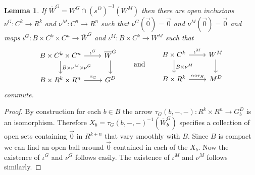 \documentclass[10pt,a4paper]{amsart}
\numberwithin{equation}{section}
\newtheorem{Lemma}[Theorem]{Lemma}
\begin{document}
\begin{Lemma}\label{open-inclusions}
If $\overline{W}^G=W^G \cap (s^D)^{-1}(W^M)$ then there are open inclusions $\nu^G\colon C^k\rightarrow R^k$ and $\nu^M\colon C^n\rightarrow R^n$ such that $\nu^G(\vec{0})=\vec{0}$ and $\nu^M(\vec{0})=\vec{0}$ and maps $\iota^G\colon B\times C^k\times C^n\rightarrow \overline{W}^G$ and $\iota^M\colon B\times C^k\rightarrow W^M$ such that
\begin{equation*}\begin{tikzcd}
B\times C^k\times C^n \rar{\iota^G} \dar{B\times \nu^M\times \nu^G} & \overline{W}^G \dar\\
B\times R^k\times R^n \rar{\tau_G} & G^D
\end{tikzcd}\qquad \text{and}\qquad
\begin{tikzcd}
B\times C^k \rar{\iota^M} \dar{B\times \nu^M} & W^M \dar \\
B\times R^k \rar{\alpha\circ\tau_H} & M^D
\end{tikzcd}\end{equation*}
commute.
\end{Lemma}
\begin{proof} By construction for each $b\in B$ the arrow $\tau_G(b,-,-)\colon R^k\times R^n\rightarrow G^D _b$ is an isomorphism. Therefore $X_b = \tau_G(b,-,-)^{-1}(\overline{W}^G _b)$ specif\/ies a collection of open sets containing $\vec{0}$ in $R^{k+n}$ that vary smoothly with $B$. Since $B$ is compact we can f\/ind an open ball around $\vec{0}$ contained in each of the $X_b$. Now the existence of $\iota^G$ and $\nu^G$ follows easily. The existence of $\iota^M$ and $\nu^M$ follows similarly.
\end{proof}
\end{document}
